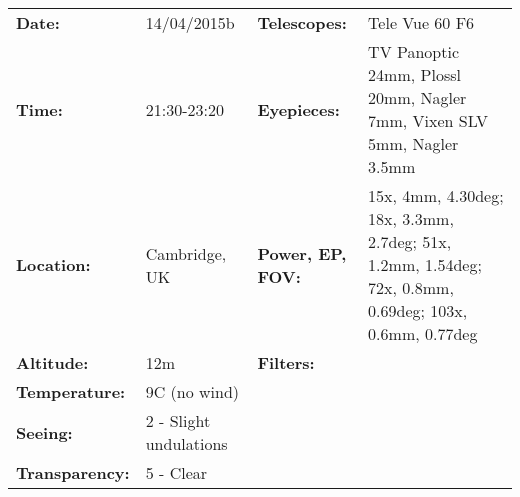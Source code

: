 \begin{tabular}{ p{0.9in} p{1.3in} p{1.2in} p{5.2in}}
{\bf Date:} & 14/04/2015b & {\bf Telescopes:} & Tele Vue 60 F6 \\ 
{\bf Time:} & 21:30-23:20 & {\bf Eyepieces:} & TV Panoptic 24mm, Plossl 20mm, Nagler 7mm, Vixen SLV 5mm, Nagler 3.5mm \\ 
{\bf Location:} & Cambridge, UK & {\bf Power, EP, FOV:} & 15x, 4mm, 4.30deg; 18x, 3.3mm, 2.7deg; 51x, 1.2mm, 1.54deg; 72x, 0.8mm, 0.69deg; 103x, 0.6mm, 0.77deg \\ 
{\bf Altitude:} & 12m & {\bf Filters:} &  \\ 
{\bf Temperature:} & 9C (no wind) & & \\ 
{\bf Seeing:} & 2 - Slight undulations & & \\ 
{\bf Transparency:} & 5 - Clear & & \\ 
\end{tabular}

